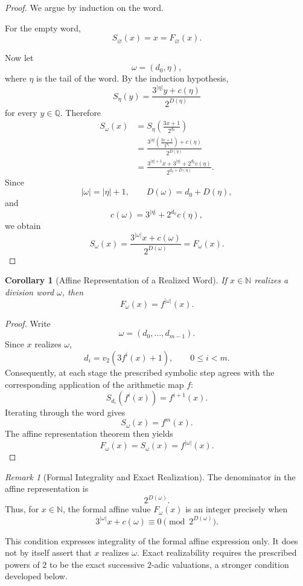 \documentclass[12pt, oneside]{article}
\numberwithin{equation}{section}
\theoremstyle{definition}
\theoremstyle{plain}
\newtheorem{corollary}[theorem]{Corollary}
\theoremstyle{remark}
\newtheorem*{remark}{Remark}
\begin{document}
\begin{proof}
We argue by induction on the word.

For the empty word,
\[
S_{\varnothing}(x)=x=F_{\varnothing}(x).
\]

Now let
\[
\omega=(d_0,\eta),
\]
where \(\eta\) is the tail of the word. By the induction hypothesis,
\[
S_\eta(y)
=
\frac{3^{|\eta|}y+c(\eta)}
     {2^{D(\eta)}}
\]
for every \(y\in\mathbb Q\). Therefore
\[
\begin{aligned}
S_\omega(x)
&=
S_\eta\!\left(\frac{3x+1}{2^{d_0}}\right)\\
&=
\frac{
3^{|\eta|}
\left(\frac{3x+1}{2^{d_0}}\right)
+c(\eta)}
{2^{D(\eta)}}\\
&=
\frac{
3^{|\eta|+1}x
+
3^{|\eta|}
+
2^{d_0}c(\eta)}
{2^{d_0+D(\eta)}}.
\end{aligned}
\]
Since
\[
|\omega|=|\eta|+1,
\qquad
D(\omega)=d_0+D(\eta),
\]
and
\[
c(\omega)
=
3^{|\eta|}
+
2^{d_0}c(\eta),
\]
we obtain
\[
S_\omega(x)
=
\frac{3^{|\omega|}x+c(\omega)}
     {2^{D(\omega)}}
=
F_\omega(x).
\]
\end{proof}

\begin{corollary}[Affine Representation of a Realized Word]
If \(x\in\mathbb N\) realizes a division word \(\omega\), then
\[
F_\omega(x)=f^{|\omega|}(x).
\]
\end{corollary}

\begin{proof}
Write
\[
\omega=(d_0,\dots,d_{m-1}).
\]
Since \(x\) realizes \(\omega\),
\[
d_i
=
v_2\!\left(3f^i(x)+1\right),
\qquad
0\le i<m.
\]
Consequently, at each stage the prescribed symbolic step agrees with the
corresponding application of the arithmetic map \(f\):
\[
S_{d_i}(f^i(x))=f^{i+1}(x).
\]
Iterating through the word gives
\[
S_\omega(x)=f^m(x).
\]
The affine representation theorem then yields
\[
F_\omega(x)=S_\omega(x)=f^{|\omega|}(x).
\]
\end{proof}

\begin{remark}[Formal Integrality and Exact Realization]
The denominator in the affine representation is
\[
2^{D(\omega)}.
\]
Thus, for \(x\in\mathbb N\), the formal affine value \(F_\omega(x)\) is an
integer precisely when
\[
3^{|\omega|}x+c(\omega)
\equiv
0
\pmod{2^{D(\omega)}}.
\]

This condition expresses integrality of the formal affine expression only.
It does not by itself assert that \(x\) realizes \(\omega\). Exact
realizability requires the prescribed powers of \(2\) to be the exact
successive \(2\)-adic valuations, a stronger condition developed below.
\end{remark}
\end{document}
